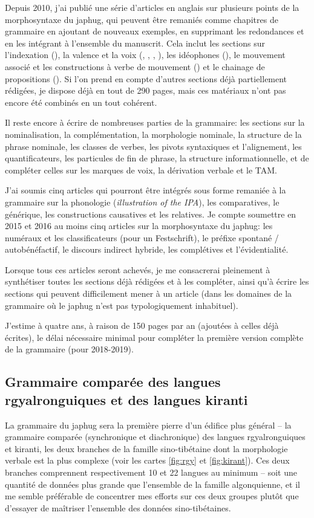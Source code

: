 \documentclass[oldfontcommands,oneside,a4paper,11pt]{article}
\begin{document}
Depuis 2010, j'ai publié une série d'articles en anglais sur plusieurs points de la morphosyntaxe du japhug, qui peuvent être remaniés comme chapitres de grammaire en ajoutant de nouveaux exemples, en supprimant les redondances et en les intégrant à l'ensemble du manuscrit. Cela inclut les sections sur l'indexation (\citealt{jacques10inverse}), la valence et la voix (\citealt{jacques12demotion}, \citealt{jacques12incorp}, \citealt{jacques13tropative},   \citealt{jacques14antipassive}), les idéophones (\citealt{japhug14ideophones}), le mouvement associé et les constructions à verbe de mouvement (\citealt{jacques13harmonization}) et le chainage de propositions (\citealt{jacques14linking}). Si l'on prend en compte d'autres sections déjà partiellement rédigées, je dispose déjà en tout de 290 pages, mais ces matériaux n'ont pas encore été combinés en un  tout cohérent.

Il reste encore à écrire de nombreuses parties de la grammaire: les sections sur la nominalisation, la complémentation, la morphologie nominale, la structure de la phrase nominale, les classes de verbes, les pivots syntaxiques et l'alignement, les quantificateurs, les particules de fin de phrase, la structure informationnelle, et de compléter celles sur les marques de voix, la dérivation verbale et le TAM.

  J'ai soumis cinq articles qui pourront être intégrés sous forme remaniée à la grammaire sur la phonologie (\textit{illustration of the IPA}), les comparatives, le générique, les constructions causatives et les relatives. Je compte soumettre en 2015 et 2016 au moins cinq articles sur la morphosyntaxe du japhug: les numéraux et les classificateurs (pour un Festschrift), le préfixe spontané / autobénéfactif, le discours indirect hybride, les complétives et l'évidentialité. 
  
  Lorsque tous ces articles seront achevés, je me consacrerai pleinement  à synthétiser toutes les sections déjà rédigées et à les compléter, ainsi qu'à écrire les sections qui peuvent difficilement mener à un article (dans les domaines de la grammaire où le japhug n'est pas typologiquement inhabituel).

J'estime à quatre ans, à raison de 150 pages par an (ajoutées à celles déjà écrites), le délai nécessaire minimal pour compléter la première version complète de la grammaire (pour 2018-2019).

\subsection{Grammaire comparée des langues rgyalronguiques et des langues kiranti}
La grammaire du japhug sera la première pierre d'un édifice plus général -- la grammaire comparée (synchronique et diachronique) des langues rgyalronguiques et kiranti, les deux branches de la famille sino-tibétaine dont la morphologie verbale est la plus complexe (voir les cartes  \ref{fig:rgy}  et \ref{fig:kirant}). Ces deux branches comprennent respectivement 10 et 22 langues au minimum -- soit une quantité de données plus grande que l'ensemble de la famille algonquienne, et il me semble préférable de concentrer mes efforts sur ces deux groupes plutôt que d'essayer de maîtriser l'ensemble des données sino-tibétaines.
\end{document}
